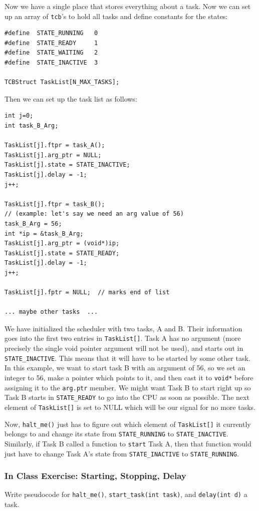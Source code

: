\documentclass{article}	%
\begin{document}
Now we have a single place that stores everything about a task.  Now we can set up an array of {\tt tcb}'s to hold all tasks and define constants for the states:


\begin{verbatim}
#define  STATE_RUNNING   0
#define  STATE_READY     1
#define  STATE_WAITING   2
#define  STATE_INACTIVE  3

TCBStruct TaskList[N_MAX_TASKS];
\end{verbatim}

Then we can set up the task list as follows:

\begin{verbatim} 
int j=0;
int task_B_Arg;

TaskList[j].ftpr = task_A();
TaskList[j].arg_ptr = NULL; 
TaskList[j].state = STATE_INACTIVE;
TaskList[j].delay = -1;
j++;

TaskList[j].ftpr = task_B();
// (example: let's say we need an arg value of 56)
task_B_Arg = 56;    
int *ip = &task_B_Arg;
TaskList[j].arg_ptr = (void*)ip; 
TaskList[j].state = STATE_READY;
TaskList[j].delay = -1;
j++;

TaskList[j].fptr = NULL;  // marks end of list

... maybe other tasks  ...
\end{verbatim}

We have initialized the scheduler with two tasks, A and B.  Their information goes into the first two entries in {\tt TaskList[]}.   Task A has no argument (more precisely the single void pointer argument will not be used), and starts out in {\tt STATE\_INACTIVE}.   This means that it will have to be started by some other task.   In this example, we want to start task B with an argument of 56, so we set an integer to 56, make a pointer which points to it, and then cast it to {\tt void*} before assigning it to the {\tt arg.ptr} member.   We might want Task B to start right up so Task B starts in {\tt STATE\_READY} to
go into the CPU as soon as possible.   The next element of {\tt TaskList[]} is set to NULL which will be our signal for no more tasks. 

Now, {\tt halt\_me()} just has to figure out which element of {\tt TaskList[]} it currently belongs to and change its state from {\tt STATE\_RUNNING} to {\tt STATE\_INACTIVE}.   Similarly, if Task B called a function to {\tt start} Task A, then that function would just have to change Task A's state from {\tt STATE\_INACTIVE} to {\tt STATE\_RUNNING}.
\subsubsection*{In Class Exercise: Starting, Stopping, Delay}
 Write pseudocode for {\tt halt\_me()}, {\tt start\_task(int task)},  and {\tt delay(int d)} a task.  
 
\end{document}
